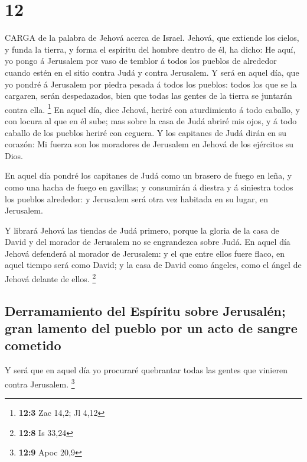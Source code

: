 \hypertarget{section-11}{%
\section{12}\label{section-11}}

 CARGA de la palabra de Jehová acerca de Israel. Jehová, que
extiende los cielos, y funda la tierra, y forma el espíritu del hombre
dentro de él, ha dicho:  He aquí, yo pongo á Jerusalem por
vaso de temblor á todos los pueblos de alrededor cuando estén en el
sitio contra Judá y contra Jerusalem.  Y será en aquel día,
que yo pondré á Jerusalem por piedra pesada á todos los pueblos: todos
los que se la cargaren, serán despedazados, bien que todas las gentes de
la tierra se juntarán contra ella. \footnote{\textbf{12:3} Zac 14,2; Jl
  4,12}  En aquel día, dice Jehová, heriré con aturdimiento
á todo caballo, y con locura al que en él sube; mas sobre la casa de
Judá abriré mis ojos, y á todo caballo de los pueblos heriré con
ceguera.  Y los capitanes de Judá dirán en su corazón: Mi
fuerza son los moradores de Jerusalem en Jehová de los ejércitos su
Dios.

 En aquel día pondré los capitanes de Judá como un brasero
de fuego en leña, y como una hacha de fuego en gavillas; y consumirán á
diestra y á siniestra todos los pueblos alrededor: y Jerusalem será otra
vez habitada en su lugar, en Jerusalem.

 Y librará Jehová las tiendas de Judá primero, porque la
gloria de la casa de David y del morador de Jerusalem no se engrandezca
sobre Judá.  En aquel día Jehová defenderá al morador de
Jerusalem: y el que entre ellos fuere flaco, en aquel tiempo será como
David; y la casa de David como ángeles, como el ángel de Jehová delante
de ellos. \footnote{\textbf{12:8} Is 33,24}

\hypertarget{derramamiento-del-espuxedritu-sobre-jerusaluxe9n-gran-lamento-del-pueblo-por-un-acto-de-sangre-cometido}{%
\subsection{Derramamiento del Espíritu sobre Jerusalén; gran lamento del
pueblo por un acto de sangre
cometido}\label{derramamiento-del-espuxedritu-sobre-jerusaluxe9n-gran-lamento-del-pueblo-por-un-acto-de-sangre-cometido}}

 Y será que en aquel día yo procuraré quebrantar todas las
gentes que vinieren contra Jerusalem. \footnote{\textbf{12:9} Apoc 20,9}

